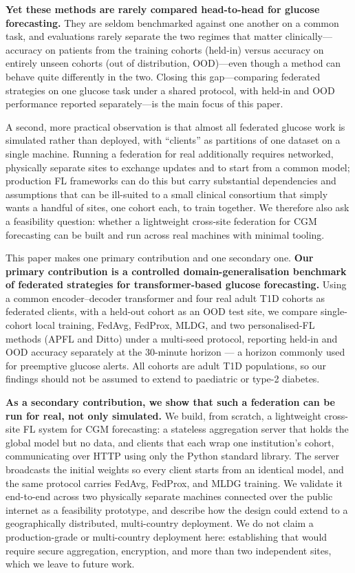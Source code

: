 \documentclass[10pt,letterpaper]{article}
\begin{document}
\textbf{Yet these methods are rarely compared head-to-head for glucose
forecasting.} They are seldom benchmarked against one another on a common task, and
evaluations rarely separate the two regimes that matter clinically---accuracy on
patients from the training cohorts (held-in) versus accuracy on entirely unseen
cohorts (out of distribution, OOD)---even though a method can behave quite
differently in the two. Closing this gap---comparing federated strategies on one
glucose task under a shared protocol, with held-in and OOD performance reported
separately---is the main focus of this paper.

A second, more practical observation is that almost all federated glucose work is
simulated rather than deployed, with ``clients'' as partitions of one dataset on a
single machine. Running a federation for real additionally requires networked,
physically separate sites to exchange updates and to start from a common model;
production FL frameworks can do this but carry substantial dependencies and
assumptions that can be ill-suited to a small clinical consortium that simply wants
a handful of sites, one cohort each, to train together. We therefore also ask a
feasibility question: whether a lightweight cross-site federation for CGM
forecasting can be built and run across real machines with minimal tooling.

This paper makes one primary contribution and one secondary one. \textbf{Our
primary contribution is a controlled domain-generalisation benchmark of federated
strategies for transformer-based glucose forecasting.} Using a common
encoder--decoder transformer and four real adult T1D cohorts as federated
clients, with a held-out cohort as an OOD test site, we compare single-cohort
local training, FedAvg, FedProx, MLDG, and two personalised-FL methods (APFL and
Ditto) under a multi-seed protocol, reporting held-in and OOD accuracy separately
at the 30-minute horizon --- a horizon commonly used for preemptive glucose
alerts. All cohorts are adult T1D populations, so our findings should not be
assumed to extend to paediatric or type-2 diabetes.

\textbf{As a secondary contribution, we show that such a federation can be run for
real, not only simulated.} We build, from scratch, a lightweight cross-site FL
system for CGM forecasting: a stateless aggregation server that holds the global
model but no data, and clients that each wrap one institution's cohort,
communicating over HTTP using only the Python standard library. The server
broadcasts the initial weights so every client starts from an identical model, and
the same protocol carries FedAvg, FedProx, and MLDG training. We validate it
end-to-end across two physically separate machines connected over the public
internet as a feasibility prototype, and describe how the design could extend to
a geographically distributed, multi-country deployment. We do not claim a
production-grade or multi-country deployment here: establishing that would
require secure aggregation, encryption, and more than two independent sites,
which we leave to future work.
\end{document}
